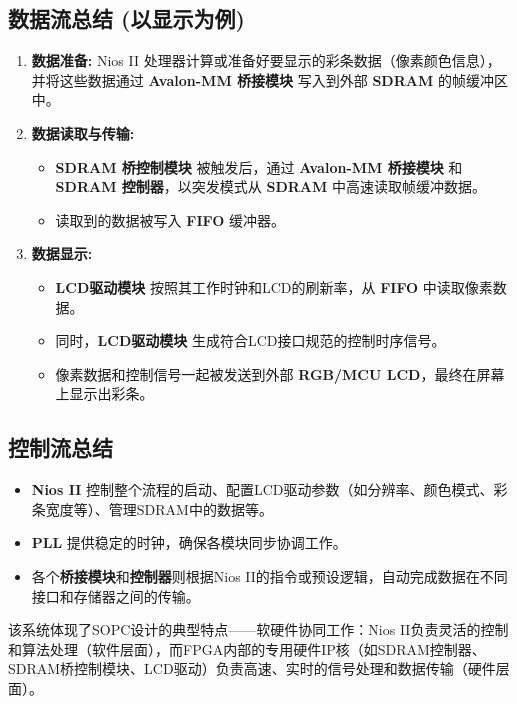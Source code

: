 \documentclass[12pt,hyperref,a4paper,UTF8]{ctexart}
\begin{document}
\subsection*{数据流总结 (以显示为例)}
\begin{enumerate}
    \item \textbf{数据准备:} Nios II 处理器计算或准备好要显示的彩条数据（像素颜色信息），并将这些数据通过 \textbf{Avalon-MM 桥接模块} 写入到外部 \textbf{SDRAM} 的帧缓冲区中。
    \item \textbf{数据读取与传输:}
    \begin{itemize}
        \item \textbf{SDRAM 桥控制模块} 被触发后，通过 \textbf{Avalon-MM 桥接模块} 和 \textbf{SDRAM 控制器}，以突发模式从 \textbf{SDRAM} 中高速读取帧缓冲数据。
        \item 读取到的数据被写入 \textbf{FIFO} 缓冲器。
    \end{itemize}
    \item \textbf{数据显示:}
    \begin{itemize}
        \item \textbf{LCD驱动模块} 按照其工作时钟和LCD的刷新率，从 \textbf{FIFO} 中读取像素数据。
        \item 同时，\textbf{LCD驱动模块} 生成符合LCD接口规范的控制时序信号。
        \item 像素数据和控制信号一起被发送到外部 \textbf{RGB/MCU LCD}，最终在屏幕上显示出彩条。
    \end{itemize}
\end{enumerate}

\subsection*{控制流总结}
\begin{itemize}
    \item \textbf{Nios II} 控制整个流程的启动、配置LCD驱动参数（如分辨率、颜色模式、彩条宽度等）、管理SDRAM中的数据等。
    \item \textbf{PLL} 提供稳定的时钟，确保各模块同步协调工作。
    \item 各个\textbf{桥接模块}和\textbf{控制器}则根据Nios II的指令或预设逻辑，自动完成数据在不同接口和存储器之间的传输。
\end{itemize}

该系统体现了SOPC设计的典型特点——软硬件协同工作：Nios II负责灵活的控制和算法处理（软件层面），而FPGA内部的专用硬件IP核（如SDRAM控制器、SDRAM桥控制模块、LCD驱动）负责高速、实时的信号处理和数据传输（硬件层面）。
\end{document}
